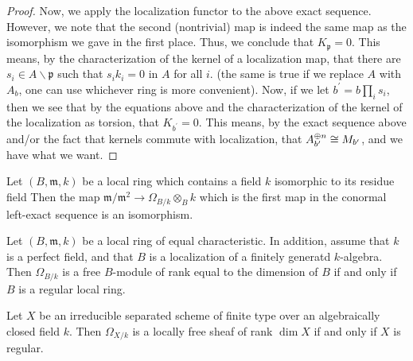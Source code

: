 \begin{proof}
	Now, we apply the localization functor to the above
	exact sequence. 
	However, we note that the second (nontrivial) map
	is indeed the same map as the isomorphism we
	gave in the first place.
	Thus, we conclude that \(K_{\mathfrak{p}} = 0\).
	This means, by the characterization
	of the kernel of a localization map,
	that there are \(s_{i} \in A \smallsetminus \mathfrak{p}\) 
	such that \(s_{i}k_{i} = 0\) in \(A\) for all \(i\).
	(the same is true if we replace  \(A\) with \(A_{b}\),
	one can use whichever ring is more convenient).
	Now, if we let 
	\(b^{\prime} = b \prod_{i}^{} s_{i} \),
	then we see that by the equations above
	and the characterization of the kernel of the localization
	as torsion, that
	\(K_{b^{\prime}} = 0\).
	This means, by the exact sequence above and/or the fact
	that kernels commute with localization,
	that \(A_{b^{\prime}}^{\oplus n} \cong M_{b^{\prime}}\),
	and we have what we want.
	
\end{proof}

\begin{thm}
	[Hartshorne II.8.7]
	Let \((B,\mathfrak{m},k)\) be a local ring 
	which contains a field \(k\) 
	isomorphic to its residue field
	Then the map 
	\(\mathfrak{m} / \mathfrak{m}^{2} \to \Omega_{B / k} \otimes_{B} k\)
	which is the first map in the 
	conormal left-exact sequence
	is an isomorphism.
\end{thm}


\begin{thm}
	[Hartshorne II.8.8]
	Let \((B,\mathfrak{m},k)\) be a local ring of
	equal characteristic.
	In addition, assume that
	\(k\) is a perfect field,
	and that \(B\) is a localization of
	a finitely generatd \(k\)-algebra.
	Then \(\Omega_{B / k}\) is a free \(B\)-module
	of rank equal to the dimension of \(B\) 
	if and only if \(B\) is a regular local ring.

\end{thm}


\begin{thm}
	[Hartshorne II.8.15]
	Let \(X\) be an irreducible separated scheme of finite type 
	over an algebraically closed field \(k\).
	Then \(\Omega_{X / k}\) is a locally free
	sheaf of rank \(\dim X\) if and only if 
	\(X\) is regular.
\end{thm}



